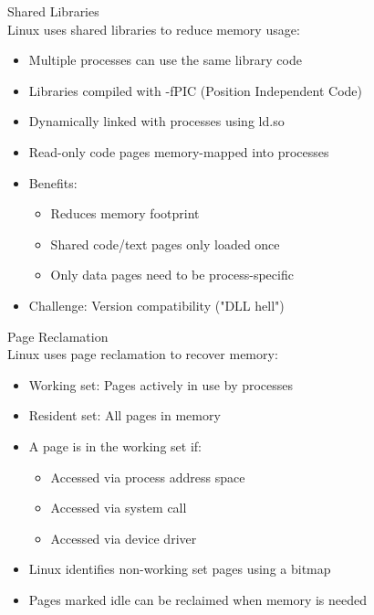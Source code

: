 \begin{definition}{Shared Libraries}\\
    Linux uses shared libraries to reduce memory usage:
    \begin{itemize}
        \item Multiple processes can use the same library code
        \item Libraries compiled with -fPIC (Position Independent Code)
        \item Dynamically linked with processes using ld.so
        \item Read-only code pages memory-mapped into processes
        \item Benefits:
            \begin{itemize}
                \item Reduces memory footprint
                \item Shared code/text pages only loaded once
                \item Only data pages need to be process-specific
            \end{itemize}
        \item Challenge: Version compatibility ("DLL hell")
    \end{itemize}
\end{definition}

\begin{definition}{Page Reclamation}\\
    Linux uses page reclamation to recover memory:
    \begin{itemize}
        \item Working set: Pages actively in use by processes
        \item Resident set: All pages in memory
        \item A page is in the working set if:
            \begin{itemize}
                \item Accessed via process address space
                \item Accessed via system call
                \item Accessed via device driver
            \end{itemize}
        \item Linux identifies non-working set pages using a bitmap
        \item Pages marked idle can be reclaimed when memory is needed
    \end{itemize}
\end{definition}


